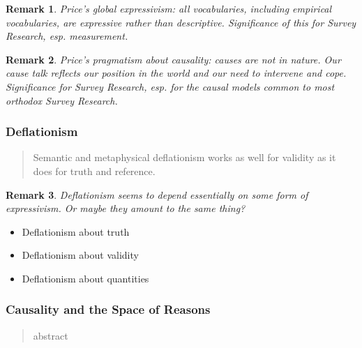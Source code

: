 \documentclass[11pt,twoside]{article}
\newtheorem{remark}{Remark}
\newcommand{\SR}{Survey Research}
\begin{document}
\begin{remark}
Price's global expressivism: all vocabularies, including empirical
vocabularies, are expressive rather than descriptive.  Significance of
this for \SR{}, esp. measurement.
\end{remark}

\begin{remark}
  Price's pragmatism about causality: causes are not in nature.  Our
  cause talk reflects our position in the world and our need to
  intervene and cope.  Significance for \SR{}, esp. for the causal
  models common to most orthodox \SR{}.
\end{remark}

\subsubsection{Deflationism}

\begin{abstract}
Semantic and metaphysical deflationism works as well for validity as
it does for truth and reference.
\end{abstract}

\begin{remark}
  Deflationism seems to depend essentially on some form of
  expressivism.  Or maybe they amount to the same thing?
\end{remark}

\begin{itemize}
\item Deflationism about truth
\item Deflationism about validity
\item Deflationism about quantities
\end{itemize}


\subsubsection{Causality and the Space of Reasons}

\begin{abstract}
abstract
\end{abstract}

\noindent
\cite{abell_narrative_2004} \\
\cite{crane_mental_1995} \\
\cite{gross_pragmatist_2009} \\
\cite{jackson_mental_1996} \\
\cite{lowe_causal_1993} \\
\cite{lowe_non-cartesian_2006} \\
\cite{macdonald_mental_1986} \\
\cite{menzies_causation_1993} \\
\cite{morris_causes_1986} \\
\cite{williamson_broadness_1998}
\end{document}
